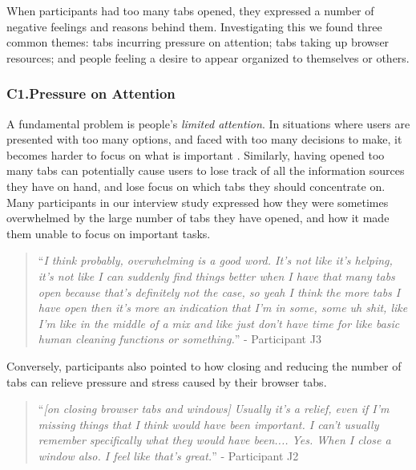 When participants had too many tabs opened, they expressed a number of negative feelings and reasons behind them. Investigating this we found three common themes: tabs incurring pressure on attention; tabs taking up browser resources; and people feeling a desire to appear organized to themselves or others. %

\subsubsection{C1.Pressure on Attention}

A fundamental problem is people's \emph{limited attention}. In situations where users are presented with too many options, and faced with too many decisions to make, it becomes harder to focus on what is important \cite{schwartz2004paradox,wilson2008improving}. Similarly, having opened too many tabs can potentially cause users to lose track of all the information sources they have on hand, and lose focus on which tabs they should concentrate on. Many participants in our interview study expressed how they were sometimes overwhelmed by the large number of tabs they have opened, and how it made them unable to focus on important tasks.

\begin{quote} 
``\emph{I think probably, overwhelming is a good word. It's not like it's helping, it's not like I can suddenly find things better when I have that many tabs open because that's definitely not the case, so yeah I think the more tabs I have open then it's more an indication that I'm in some, some uh shit, like I'm like in the middle of a mix and like just don't have time for like basic human cleaning functions or something.}'' - Participant J3

\end{quote}

Conversely, participants also pointed to how closing and reducing the number of tabs can relieve pressure and stress caused by their browser tabs. 

\begin{quote}
``\emph{[on closing browser tabs and windows] Usually it's a relief, even if I'm missing things that I think would have been important. I can't usually remember specifically what they would have been.... Yes. When I close a window also. I feel like that's great.}'' - Participant J2
\end{quote}


